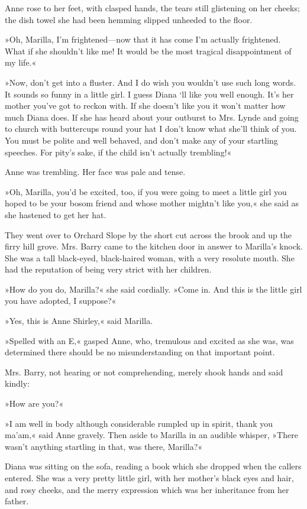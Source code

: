 Anne rose to her feet, with clasped hands, the tears still glistening on her cheeks; the dish towel she had been hemming slipped unheeded to the floor.

»Oh, Marilla, I'm frightened—now that it has come I'm actually frightened. What if she shouldn't like me! It would be the most tragical disappointment of my life.«

»Now, don't get into a fluster. And I do wish you wouldn't use such long words. It sounds so funny in a little girl. I guess Diana `ll like you well enough. It's her mother you've got to reckon with. If she doesn't like you it won't matter how much Diana does. If she has heard about your outburst to Mrs. Lynde and going to church with buttercups round your hat I don't know what she'll think of you. You must be polite and well behaved, and don't make any of your startling speeches. For pity's sake, if the child isn't actually trembling!«

Anne was trembling. Her face was pale and tense.

»Oh, Marilla, you'd be excited, too, if you were going to meet a little girl you hoped to be your bosom friend and whose mother mightn't like you,« she said as she hastened to get her hat.

They went over to Orchard Slope by the short cut across the brook and up the firry hill grove. Mrs. Barry came to the kitchen door in answer to Marilla's knock. She was a tall black-eyed, black-haired woman, with a very resolute mouth. She had the reputation of being very strict with her children.

»How do you do, Marilla?« she said cordially. »Come in. And this is the little girl you have adopted, I suppose?«

»Yes, this is Anne Shirley,« said Marilla.

»Spelled with an E,« gasped Anne, who, tremulous and excited as she was, was determined there should be no misunderstanding on that important point.

Mrs. Barry, not hearing or not comprehending, merely shook hands and said kindly:

»How are you?«

»I am well in body although considerable rumpled up in spirit, thank you ma'am,« said Anne gravely. Then aside to Marilla in an audible whisper, »There wasn't anything startling in that, was there, Marilla?«

Diana was sitting on the sofa, reading a book which she dropped when the callers entered. She was a very pretty little girl, with her mother's black eyes and hair, and rosy cheeks, and the merry expression which was her inheritance from her father.

